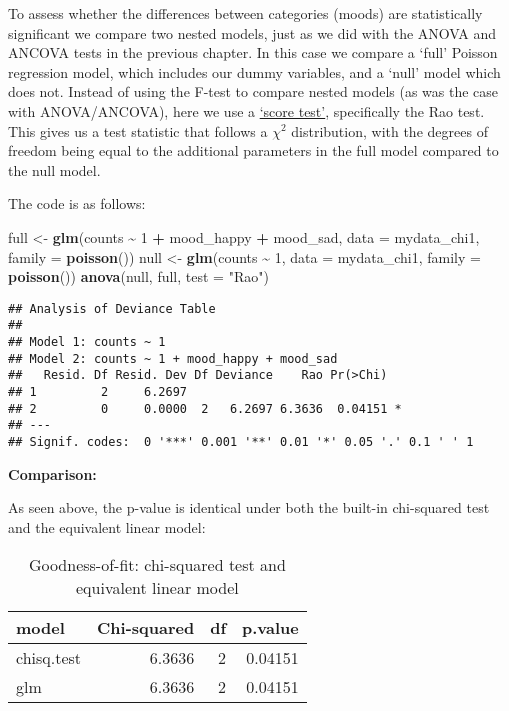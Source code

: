 \documentclass[
  12pt,
]{krantz}
\newenvironment{Shaded}{\begin{snugshade}}{\end{snugshade}}
\newcommand{\DataTypeTok}[1]{\textcolor[rgb]{0.13,0.29,0.53}{#1}}
\newcommand{\DecValTok}[1]{\textcolor[rgb]{0.00,0.00,0.81}{#1}}
\newcommand{\KeywordTok}[1]{\textcolor[rgb]{0.13,0.29,0.53}{\textbf{#1}}}
\newcommand{\NormalTok}[1]{#1}
\newcommand{\OperatorTok}[1]{\textcolor[rgb]{0.81,0.36,0.00}{\textbf{#1}}}
\newcommand{\StringTok}[1]{\textcolor[rgb]{0.31,0.60,0.02}{#1}}
\begin{document}
To assess whether the differences between categories (moods) are statistically significant we compare two nested models, just as we did with the ANOVA and ANCOVA tests in the previous chapter. In this case we compare a `full' Poisson regression model, which includes our dummy variables, and a `null' model which does not. Instead of using the F-test to compare nested models (as was the case with ANOVA/ANCOVA), here we use a \href{https://en.wikipedia.org/wiki/Score_test}{`score test'}, specifically the Rao test. This gives us a test statistic that follows a \(\chi^2\) distribution, with the degrees of freedom being equal to the additional parameters in the full model compared to the null model.

The code is as follows:

\begin{Shaded}
\begin{Highlighting}[]
\NormalTok{full \textless{}{-}}\StringTok{ }\KeywordTok{glm}\NormalTok{(counts }\OperatorTok{\textasciitilde{}}\StringTok{ }\DecValTok{1} \OperatorTok{+}\StringTok{ }\NormalTok{mood\_happy }\OperatorTok{+}\StringTok{ }\NormalTok{mood\_sad,}
            \DataTypeTok{data =}\NormalTok{ mydata\_chi1,}
            \DataTypeTok{family =} \KeywordTok{poisson}\NormalTok{())}
\NormalTok{null \textless{}{-}}\StringTok{ }\KeywordTok{glm}\NormalTok{(counts }\OperatorTok{\textasciitilde{}}\StringTok{ }\DecValTok{1}\NormalTok{,  }\DataTypeTok{data =}\NormalTok{ mydata\_chi1, }\DataTypeTok{family =} \KeywordTok{poisson}\NormalTok{())}
\KeywordTok{anova}\NormalTok{(null, full, }\DataTypeTok{test =} \StringTok{"Rao"}\NormalTok{)}
\end{Highlighting}
\end{Shaded}

\begin{verbatim}
## Analysis of Deviance Table
## 
## Model 1: counts ~ 1
## Model 2: counts ~ 1 + mood_happy + mood_sad
##   Resid. Df Resid. Dev Df Deviance    Rao Pr(>Chi)  
## 1         2     6.2697                              
## 2         0     0.0000  2   6.2697 6.3636  0.04151 *
## ---
## Signif. codes:  0 '***' 0.001 '**' 0.01 '*' 0.05 '.' 0.1 ' ' 1
\end{verbatim}

\textbf{Comparison:}

As seen above, the p-value is identical under both the built-in chi-squared test and the equivalent linear model:

\begin{table}

\caption{\label{tab:unnamed-chunk-59}Goodness-of-fit: chi-squared test and equivalent linear model}
\centering
\begin{tabular}[t]{lrrr}
\toprule
model & Chi-squared & df & p.value\\
\midrule
chisq.test & 6.3636 & 2 & 0.04151\\
glm & 6.3636 & 2 & 0.04151\\
\bottomrule
\end{tabular}
\end{table}
\end{document}
